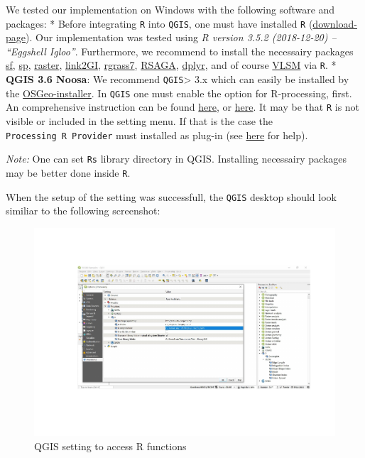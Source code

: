 \documentclass[]{article}
\begin{document}
We tested our implementation on Windows with the following software and
packages: * Before integrating \texttt{R} into \texttt{QGIS}, one must
have installed \texttt{R}
(\href{https://cran.r-project.org/}{download-page}). Our implementation
was tested using \emph{R version 3.5.2 (2018-12-20) -- ``Eggshell
Igloo''}. Furthermore, we recommend to install the necessairy packages
\href{https://cran.r-project.org/web/packages/sf/index.html}{sf},
\href{https://cran.r-project.org/web/packages/sp/index.html}{sp},
\href{https://cran.r-project.org/web/packages/raster/index.html}{raster},
\href{https://cran.r-project.org/web/packages/link2GI/index.html}{link2GI},
\href{https://cran.r-project.org/web/packages/rgrass7/index.html}{rgrass7},
\href{https://cran.r-project.org/web/packages/RSAGA/index.html}{RSAGA},
\href{https://cran.r-project.org/web/packages/dplyr/index.html}{dplyr},
and of course \href{https://github.com/raff-k/VLSM}{VLSM} via
\texttt{R}. * \textbf{QGIS 3.6 Noosa}: We recommend
\texttt{QGIS}\textgreater{} 3.x which can easily be installed by the
\href{https://live.osgeo.org/de/download.html}{OSGeo-installer}. In
\texttt{QGIS} one must enable the option for R-processing, first. An
comprehensive instruction can be found
\href{https://docs.qgis.org/3.4/en/docs/training_manual/processing/r_intro.html}{here},
or
\href{https://gis.stackexchange.com/questions/273623/r-scripts-in-qgis-3-0}{here}.
It may be that \texttt{R} is not visible or included in the setting
menu. If that is the case the \texttt{Processing\ R\ Provider} must
installed as plug-in (see
\href{https://gis.stackexchange.com/questions/273623/r-scripts-in-qgis-3-0}{here}
for help).

\emph{Note:} One can set \texttt{R\textquotesingle{}s} library directory
in QGIS. Installing necessairy packages may be better done inside
\texttt{R}.

When the setup of the setting was successfull, the \texttt{QGIS} desktop
should look similiar to the following screenshot:

\begin{figure}[H]

{\centering \includegraphics[width=1\linewidth]{vignette_QGIS_files/figure-latex/unnamed-chunk-2-1} 

}

\caption{QGIS setting to access R functions}\label{fig:unnamed-chunk-2}
\end{figure}
\end{document}
